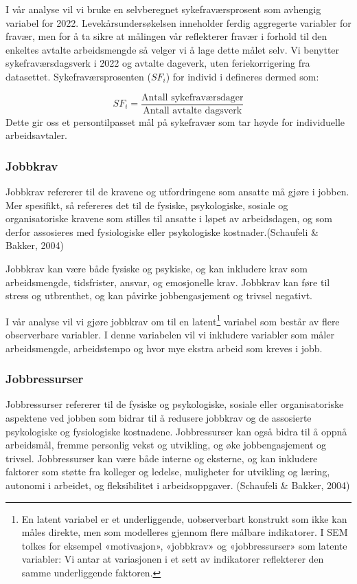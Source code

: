 \documentclass[
  12pt,
  a4paper,
  DIV=11,
  numbers=noendperiod]{scrartcl}
\begin{document}
I vår analyse vil vi bruke en selvberegnet sykefraværsprosent som
avhengig variabel for 2022. Levekårsundersøkelsen inneholder ferdig
aggregerte variabler for fravær, men for å ta sikre at målingen vår
reflekterer fravær i forhold til den enkeltes avtalte arbeidsmengde så
velger vi å lage dette målet selv. Vi benytter sykefraværsdagsverk i
2022 og avtalte dageverk, uten feriekorrigering fra datasettet.
Sykefraværsprosenten (\(SF_i\)) for individ i defineres dermed som:

\[
SF_i = \frac{ \text{Antall sykefraværsdager}}{\text{Antall avtalte dagsverk}} 
\] Dette gir oss et persontilpasset mål på sykefravær som tar høyde for
individuelle arbeidsavtaler.

\subsubsection{Jobbkrav}\label{jobbkrav}

Jobbkrav refererer til de kravene og utfordringene som ansatte må gjøre
i jobben. Mer spesifikt, så refereres det til de fysiske, psykologiske,
sosiale og organisatoriske kravene som stilles til ansatte i løpet av
arbeidsdagen, og som derfor assosieres med fysiologiske eller
psykologiske kostnader.(Schaufeli \& Bakker, 2004)

Jobbkrav kan være både fysiske og psykiske, og kan inkludere krav som
arbeidsmengde, tidsfrister, ansvar, og emosjonelle krav. Jobbkrav kan
føre til stress og utbrenthet, og kan påvirke jobbengasjement og trivsel
negativt.

I vår analyse vil vi gjøre jobbkrav om til en latent\footnote{En latent
  variabel er et underliggende, uobserverbart konstrukt som ikke kan
  måles direkte, men som modelleres gjennom flere målbare indikatorer. I
  SEM tolkes for eksempel «motivasjon», «jobbkrav» og «jobbressurser»
  som latente variabler: Vi antar at variasjonen i et sett av
  indikatorer reflekterer den samme underliggende faktoren.} variabel
som består av flere observerbare variabler. I denne variabelen vil vi
inkludere variabler som måler arbeidsmengde, arbeidstempo og hvor mye
ekstra arbeid som kreves i jobb.

\subsubsection{Jobbressurser}\label{jobbressurser}

Jobbressurser refererer til de fysiske og psykologiske, sosiale eller
organisatoriske aspektene ved jobben som bidrar til å redusere jobbkrav
og de assosierte psykologiske og fysiologiske kostnadene. Jobbressurser
kan også bidra til å oppnå arbeidsmål, fremme personlig vekst og
utvikling, og øke jobbengasjement og trivsel. Jobbressurser kan være
både interne og eksterne, og kan inkludere faktorer som støtte fra
kolleger og ledelse, muligheter for utvikling og læring, autonomi i
arbeidet, og fleksibilitet i arbeidsoppgaver. (Schaufeli \& Bakker,
2004)
\end{document}
